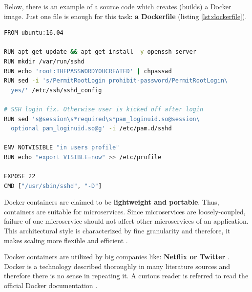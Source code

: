 Below, there is an example of a source code which creates (builds) a Docker image. Just one file is enough for this task: \textbf{a Dockerfile} (listing \ref{lst:dockerfile}).

\begin{lstlisting}[basicstyle=\scriptsize,caption={A Dockerfile to build a Docker image with SSH server installed. Based on Docker official documentation \cite{online-docker-doc-bi}},captionpos=b,language=Bash,xleftmargin=0.3cm,label={lst:dockerfile}]
FROM ubuntu:16.04

RUN apt-get update && apt-get install -y openssh-server
RUN mkdir /var/run/sshd
RUN echo 'root:THEPASSWORDYOUCREATED' | chpasswd
RUN sed -i 's/PermitRootLogin prohibit-password/PermitRootLogin\
  yes/' /etc/ssh/sshd_config

# SSH login fix. Otherwise user is kicked off after login
RUN sed 's@session\s*required\s*pam_loginuid.so@session\
  optional pam_loginuid.so@g' -i /etc/pam.d/sshd

ENV NOTVISIBLE "in users profile"
RUN echo "export VISIBLE=now" >> /etc/profile

EXPOSE 22
CMD ["/usr/sbin/sshd", "-D"]
\end{lstlisting}

Docker containers are claimed to be \textbf{lightweight and portable}. Thus, containers are suitable for microservices. Since microservices are loosely-coupled, failure of one microservice should not affect other microservices of an application. This architectural style is characterized by fine granularity and therefore, it makes scaling more flexible and efficient \cite{article-k8s-as-avail}.

Docker containers are utilized by big companies like:  \textbf{Netflix or Twitter} \cite{article-nonf-twitter-netflix}. Docker is a technology described thoroughly in many literature sources and therefore there is no sense in repeating it. A curious reader is referred to read the official Docker documentation \cite{online-docker-doc}.
